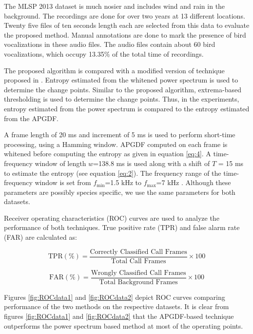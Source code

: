 \documentclass[a4paper]{article}
\begin{document}
The MLSP 2013 dataset \cite{data2} is much nosier and includes wind and rain in
the background. The recordings are done for over two years at 13 different
locations. Twenty five files of ten seconds length each are selected from this
data to evaluate the proposed method.  Manual annotations are done to mark the
presence of bird vocalizations in these audio files. The audio files contain
about 60 bird vocalizations, which occupy 13.35\% of the total time of
recordings.

The proposed algorithm is compared with a modified version of technique proposed
in \cite{wang2013}. Entropy estimated from the whitened power spectrum is used
to determine the change points. Similar to the proposed algorithm, extrema-based
thresholding is used to determine the change points. Thus, in the experiments,
entropy estimated from the power spectrum is compared to the entropy estimated
from the APGDF.
 
A frame length of 20 ms and increment of 5 ms is used to perform short-time
processing, using a Hamming window. APGDF computed on each frame is whitened before computing the
entropy as given in equation \ref{eq:4}. A time-frequency window of length $w$=138.8 ms
is used along with a shift of $T$ = 15 ms to estimate the entropy (see
equation \ref{eq:2}). The frequency range of the
time-frequency window is set from $f_{\min}$=1.5 kHz to $f_{\max}$=7 kHz
\cite{wang2013}. Although these parameters are possibly species specific, 
we use the same parameters for both datasets.

Receiver operating characteristics (ROC) curves are used to analyze the
performance of both techniques. True positive rate (TPR) and false alarm rate
(FAR) are calculated as:

\begin{equation}
\text{TPR} (\%)=\frac{\text{Correctly Classified Call Frames}}
{\text{Total Call Frames}} \times 100 
\end{equation}

\begin{equation}
\text{FAR} (\%)=\frac{\text{Wrongly Classified Call Frames}}
{\text{Total Background Frames}} \times 100 
\end{equation}

Figures \ref{fig:ROCdata1} and  \ref{fig:ROCdata2} depict ROC curves comparing
performance of the two methods on the respective datasets. It is clear from
figures \ref{fig:ROCdata1} and  \ref{fig:ROCdata2} that the APGDF-based
technique outperforms the power spectrum based method at most of the  operating
points.
\end{document}
